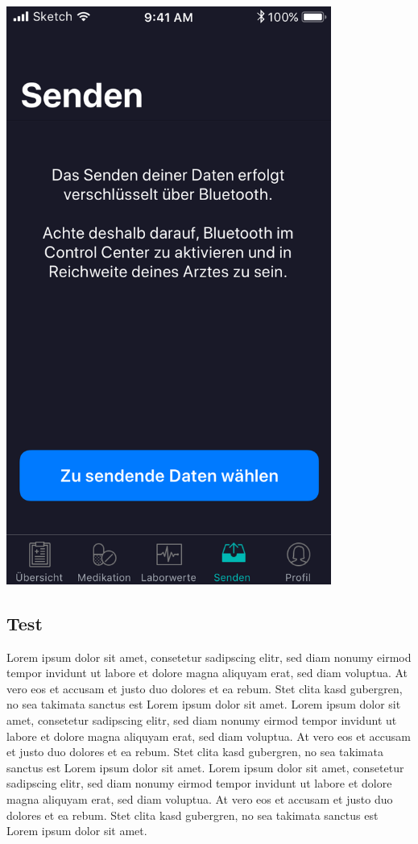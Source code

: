 \documentclass[a4paper]{scrreprt}
\begin{document}
\begin{minipage}[t][][b]{0.45\textwidth}
\includegraphics[width=0.8\textwidth]{mockups/SendTab}
\begin{flushleft}
\end{flushleft}
\end{minipage}%
\hfill
\begin{minipage}[t][][b]{0.45\textwidth}
\subsection{Test}
Lorem ipsum dolor sit amet, consetetur sadipscing elitr, sed diam nonumy eirmod tempor invidunt ut labore et dolore magna aliquyam erat, sed diam voluptua. At vero eos et accusam et justo duo dolores et ea rebum. Stet clita kasd gubergren, no sea takimata sanctus est Lorem ipsum dolor sit amet. Lorem ipsum dolor sit amet, consetetur sadipscing elitr,  sed diam nonumy eirmod tempor invidunt ut labore et dolore magna aliquyam erat, sed diam voluptua. At vero eos et accusam et justo duo dolores et ea rebum. Stet clita kasd gubergren, no sea takimata sanctus est Lorem ipsum dolor sit amet. Lorem ipsum dolor sit amet, consetetur sadipscing elitr,  sed diam nonumy eirmod tempor invidunt ut labore et dolore magna aliquyam erat, sed diam voluptua. At vero eos et accusam et justo duo dolores et ea rebum. Stet clita kasd gubergren, no sea takimata sanctus est Lorem ipsum dolor sit amet.
\end{minipage}%
\end{document}
